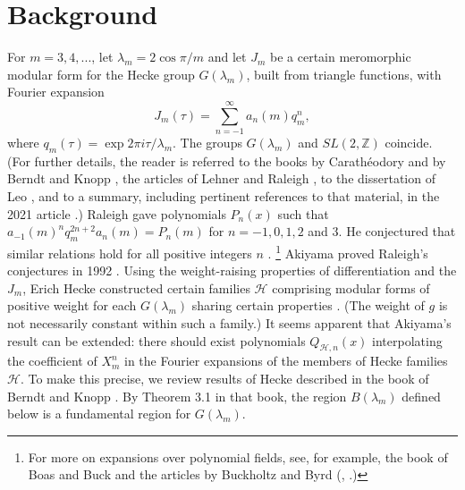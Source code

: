 \documentclass{article}
\begin{document}
\section{Background}
For $m = 3, 4, ...$,
let $\lambda_m = 2 \cos \pi/m$ and
let $J_m$ be a certain meromorphic
modular form for the Hecke group $G(\lambda_m)$,
built from triangle functions, 
with Fourier expansion
$$
J_m(\tau) = \sum_{n=-1}^\infty a_n(m)q_m^n,
$$
where
$q_m(\tau) = \exp 2 \pi i \tau/\lambda_m$.
The groups $G(\lambda_m)$ and $
SL(2,\mathbb{Z})$ coincide.
(For further details, the reader
is referred to the books by 
 Carath{\'e}odory
\cite{caratheodory1, caratheodory2}
and by Berndt and Knopp
\cite{berndt2008hecke},
the articles of Lehner and Raleigh
\cite{lehner1954note, raleigh1962fourier},
to the dissertation of Leo 
\cite{leo2008fourier}, and to a
summary, including pertinent references
to that material, in the
2021 article \cite{interpolating}.)
\newline \newline \noindent
Raleigh gave polynomials $P_n(x)$ such that 
$a_{-1}(m)^n q_m^{2n+2} a_n(m) = P_n(m)$
for  $n = -1, 0, 1, 2$ and $3$.
He conjectured that similar 
relations hold for all positive integers
$n$ \cite{raleigh1962fourier}.
\footnote{For more on
expansions over polynomial fields, see, for 
example, the book of Boas and Buck 
\cite{boas2013polynomial} and the articles 
by Buckholtz and Byrd (\cite{buckholtz1973series},
\cite{byrd}.)}
Akiyama proved Raleigh's conjectures
in 1992 \cite{akiyama1992note}.
\newline \newline \noindent
Using the weight-raising properties of 
differentiation and the $J_m$, Erich
Hecke constructed
certain families 
$\mathcal{H}$
comprising modular forms 
of positive weight
for each $G(\lambda_m)$
sharing certain properties 
\cite{hecke1936, berndt2008hecke}. 
(The weight of $g$ is not necessarily
constant within such a family.)
It seems apparent that Akiyama's 
result can be extended:
there should exist polynomials 
$Q_{\mathcal{H},n}(x)$ 
interpolating the coefficient of $X_m^n$
in the Fourier expansions of the
members of Hecke families
$\mathcal{H}$. 
\newline \newline \noindent
To make this precise, we review 
results of Hecke described in
the book of Berndt and Knopp 
\cite{berndt2008hecke}. 
By Theorem 3.1 in that book,
the region $B(\lambda_m)$ defined below is
a fundamental region for $G(\lambda_m)$.
\end{document}
